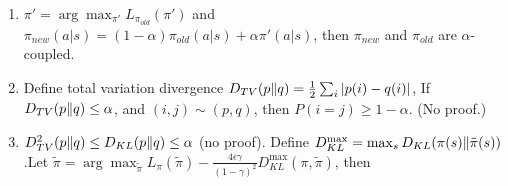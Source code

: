 \documentclass[a4paper]{article}
\newtheorem{definition}{Definition}
\begin{document}
\begin{enumerate}
\[        \]
        \begin{align*}
            \left|\mathbb{E}_{s_t\sim\tilde\pi}[\bar A(s_t)] - \mathbb{E}_{s_t\sim\pi}[\bar A(s_t)] \right|
            =&\left| P(n_t>0) \{\mathbb{E}_{s_t \sim \tilde\pi | n_t > 0}[\bar A(s_t)] - \mathbb{E}_{s_t \sim \pi | n_t > 0}[\bar A(s_t)]\}\right|\\
            \le& 2 \left[ 1 - {(1-\alpha)}^{t} \right] \max_{s} \left[ \bar A(s) \right]
        \end{align*}
        \begin{align*}
            \bar A(s) =& \mathbb{E}_{a \sim \tilde \pi(\cdot | s)}\left[ A_\pi(s,a) \right] 
            = \mathbb{E}_{(a,\tilde a) \sim (\pi, \tilde \pi)}\left[ A_\pi(s,\tilde a) - A_{\pi}(s,a)\right] 
            \quad since\quad \mathbb{E}_{a\sim\pi}\left[ A_{\pi}(s,a) \right] = 0\\
            =& P(a \ne \tilde a | s) \mathbb{E}_{(a,\tilde a) \sim (\pi, \tilde \pi) | a\ne\tilde a}\left[ A_\pi(s,\tilde a) - A_{\pi}(s,a)\right] 
        \end{align*}
        \begin{definition}
            $ (\pi, \tilde \pi) $ is $ \alpha- $coupled policy pair if $ (a, \tilde a) \sim (\pi, \tilde\pi)(s) \Rightarrow P(a \ne \tilde a | s) \le \alpha$.
        \end{definition}
        $ \alpha $-coupled policy $(\pi, \tilde\pi) \Rightarrow\bar A(s) \le 2\alpha \max_{s,a}\left| A_\pi(s,a) \right| \Rightarrow $
        \[
            \left| \eta(\tilde\pi) - L_{\pi}(\tilde \pi) \right|
            \le \sum^{\infty}_{t=0} \gamma^t \cdot 4\alpha\left[ 1 - {(1-\alpha)}^{t} \right] \max_{s,a} \left| A_{\pi}(s,a) \right|
            = \frac{4\alpha^2\gamma}{(1 - \gamma)(1 - \gamma(1 - \alpha))} \max_{s,a}\left| A_\pi (s,a) \right|
        \]
        \[
            \left| \eta(\tilde\pi) - L_{\pi}(\tilde \pi) \right|
            \le \frac{4\alpha^2\gamma}{{(1 - \gamma)}^{2}} \max_{s,a}\left| A_{\pi}(s,a) \right|
        \]
    \item $ \pi' = \arg\max_{\pi'} L_{\pi_{old}}(\pi') $ and $ \pi_{new}(a|s) = (1 - \alpha)\pi_{old}(a|s) + \alpha \pi'(a|s) $, then $ \pi_{new} $ and $ \pi_{old} $ are $ \alpha $-coupled.
    \item Define total variation divergence $ D_{TV}(p \Arrowvert q) = \frac{1}{2} \sum^{}_{i} \left| p(i) - q(i) \right| $, If $ D_{TV}(p \Arrowvert q) \le \alpha $, and $ (i,j) \sim (p,q) $, then $ P(i = j) \ge 1 - \alpha $.
        (No proof.)
    \item $ D^{2}_{TV}(p\Arrowvert q) \le D_{KL}(p \Arrowvert q)\le \alpha $ (no proof). Define $ D^{\max}_{KL} = \max_{s} D_{KL}(\pi(s) \Arrowvert \tilde\pi(s)) $.Let $ \tilde \pi  = \arg\max_{\tilde\pi} L_{\pi}(\tilde\pi) - \frac{4\epsilon\gamma}{{(1 - \gamma)}^{2}} D^{\max}_{KL}(\pi, \tilde \pi) $, then

\end{enumerate}
\end{document}
